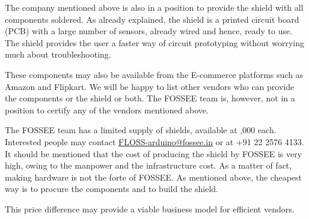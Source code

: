 The company mentioned above is also in a position to provide the
shield with all components soldered.  As already explained, the shield
is a printed circuit board (PCB) with a large number of sensors,
already wired and hence, ready to use. The shield provides the user a
faster way of circuit prototyping without worrying much about
troubleshooting.  

These components may also be available from the E-commerce platforms such
as Amazon and Flipkart.  We will be happy to list other vendors who
can provide the components or the shield or both.  The FOSSEE team is,
however, not in a position to certify any of the vendors mentioned above.

The FOSSEE team has a limited supply of shields, available at
,000 each.  Interested people may contact
\href{mailto:FLOSS-arduino@fossee.in}{FLOSS-arduino@fossee.in} or at
+91 22 2576 4133.  It should be mentioned that the cost of producing
the shield by FOSSEE is very high, owing to the manpower and the
infrastructure cost.  As a matter of fact, making hardware is not the
forte of FOSSEE.  As mentioned above, the cheapest way is to procure
the components and to build the shield.

This price difference may provide a viable business model for
efficient vendors.

